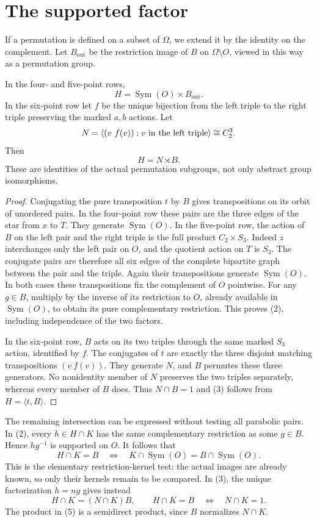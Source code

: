 \documentclass[a4paper,11pt]{article}
\newcommand{\gen}[1]{\langle#1\rangle}
\newcommand{\Sym}{\operatorname{Sym}}
\begin{document}
\section{The supported factor}
If a permutation is defined on a subset of $\Omega$, we extend it by the
identity on the complement. Let $B_{\mathrm{out}}$ be the restriction image
of $B$ on $\Omega\setminus O$, viewed in this way as a permutation group.

\begin{lemma}\label{factor}
In the four- and five-point rows,
\[
 H=\Sym(O)\times B_{\mathrm{out}}.                         \tag{2}
\]
In the six-point row let $f$ be the unique bijection from the left triple
to the right triple preserving the marked $a,b$ actions. Let
\[
 N=\gen{(v\ f(v)):v\hbox{ in the left triple}}\cong C_2^3.
\]
Then
\[
 H=N\rtimes B.                                             \tag{3}
\]
These are identities of the actual permutation subgroups, not only
abstract group isomorphisms.
\end{lemma}
\begin{proof}
Conjugating the pure transposition $t$ by $B$ gives transpositions on
its orbit of unordered pairs. In the four-point row these pairs are the
three edges of the star from $x$ to $T$. They generate $\Sym(O)$.
In the five-point row, the action of $B$ on the left pair and the right
triple is the full product $C_2\times S_3$. Indeed $z$ interchanges only
the left pair on $O$, and the quotient action on $T$ is $S_3$.
The conjugate pairs are therefore all six edges of the complete bipartite
graph between the pair and the triple. Again their transpositions generate
$\Sym(O)$. In both cases these transpositions fix the complement of $O$
pointwise. For any $g\in B$, multiply by the inverse of its restriction
to $O$, already available in $\Sym(O)$, to obtain its pure complementary
restriction. This proves (2), including independence of the two factors.

In the six-point row, $B$ acts on its two triples through the same
marked $S_3$ action, identified by $f$. The conjugates of $t$ are exactly
the three disjoint matching transpositions $(v\ f(v))$. They generate
$N$, and $B$ permutes these three generators. No nonidentity member of
$N$ preserves the two triples separately, whereas every member of $B$
does. Thus $N\cap B=1$ and (3) follows from $H=\gen{t,B}$.
\end{proof}

The remaining intersection can be expressed without testing all
parabolic pairs. In (2), every $h\in H\cap K$ has the same complementary
restriction as some $g\in B$. Hence $hg^{-1}$ is supported on $O$.
It follows that
\[
 H\cap K=B\quad\Longleftrightarrow\quad
 K\cap\Sym(O)=B\cap\Sym(O).                                \tag{4}
\]
This is the elementary restriction-kernel test: the actual images are
already known, so only their kernels remain to be compared. In (3), the
unique factorization $h=ng$ gives instead
\[
 H\cap K=(N\cap K)B,
 \qquad H\cap K=B\quad\Longleftrightarrow\quad N\cap K=1.   \tag{5}
\]
The product in (5) is a semidirect product, since $B$ normalizes $N\cap K$.
\end{document}
